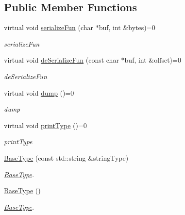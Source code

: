 \subsection*{Public Member Functions}
\begin{DoxyCompactItemize}
\item 
virtual void \hyperlink{class_a_p_i2_1_1_base_type_a3fca51717876f50b1c9b800b3eab147a}{serialize\-Fun} (char $\ast$buf, int \&bytes)=0
\begin{DoxyCompactList}\small\item\em serialize\-Fun \end{DoxyCompactList}\item 
virtual void \hyperlink{class_a_p_i2_1_1_base_type_a61b22ca8dbcfce462770ae926c0e1896}{de\-Serialize\-Fun} (const char $\ast$buf, int \&offset)=0
\begin{DoxyCompactList}\small\item\em de\-Serialize\-Fun \end{DoxyCompactList}\item 
\hypertarget{class_a_p_i2_1_1_base_type_a1601c3b7107c242a4d7fda1bd3747cb4}{virtual void \hyperlink{class_a_p_i2_1_1_base_type_a1601c3b7107c242a4d7fda1bd3747cb4}{dump} ()=0}\label{class_a_p_i2_1_1_base_type_a1601c3b7107c242a4d7fda1bd3747cb4}

\begin{DoxyCompactList}\small\item\em dump \end{DoxyCompactList}\item 
\hypertarget{class_a_p_i2_1_1_base_type_a1095fa68c69967bf9fd295289c7b47f6}{virtual void \hyperlink{class_a_p_i2_1_1_base_type_a1095fa68c69967bf9fd295289c7b47f6}{print\-Type} ()=0}\label{class_a_p_i2_1_1_base_type_a1095fa68c69967bf9fd295289c7b47f6}

\begin{DoxyCompactList}\small\item\em print\-Type \end{DoxyCompactList}\item 
\hyperlink{class_a_p_i2_1_1_base_type_a91077bf00ade01f2922c8503e061d711}{Base\-Type} (const std\-::string \&string\-Type)
\begin{DoxyCompactList}\small\item\em \hyperlink{class_a_p_i2_1_1_base_type}{Base\-Type}. \end{DoxyCompactList}\item 
\hypertarget{class_a_p_i2_1_1_base_type_abace02477dc49b409d2e5cdad941e362}{\hyperlink{class_a_p_i2_1_1_base_type_abace02477dc49b409d2e5cdad941e362}{Base\-Type} ()}\label{class_a_p_i2_1_1_base_type_abace02477dc49b409d2e5cdad941e362}

\begin{DoxyCompactList}\small\item\em \hyperlink{class_a_p_i2_1_1_base_type}{Base\-Type}. \end{DoxyCompactList}\end{DoxyCompactItemize}


